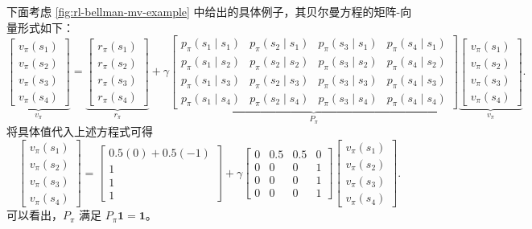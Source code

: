 下面考虑 \cref{fig:rl-bellman-mv-example} 中给出的具体例子，其贝尔曼方程的矩阵-向量形式如下：
\begin{equation*}
\underbrace{\begin{bmatrix} v_\pi(s_1) \\ v_\pi(s_2) \\ v_\pi(s_3) \\ v_\pi(s_4) \end{bmatrix}}_{v_\pi}
= \underbrace{\begin{bmatrix} r_\pi(s_1) \\ r_\pi(s_2) \\ r_\pi(s_3) \\ r_\pi(s_4) \end{bmatrix}}_{r_\pi}
+ \gamma \underbrace{\begin{bmatrix}
p_\pi(s_1 \mid s_1) & p_\pi(s_2 \mid s_1) & p_\pi(s_3 \mid s_1) & p_\pi(s_4 \mid s_1) \\
p_\pi(s_1 \mid s_2) & p_\pi(s_2 \mid s_2) & p_\pi(s_3 \mid s_2) & p_\pi(s_4 \mid s_2) \\
p_\pi(s_1 \mid s_3) & p_\pi(s_2 \mid s_3) & p_\pi(s_3 \mid s_3) & p_\pi(s_4 \mid s_3) \\
p_\pi(s_1 \mid s_4) & p_\pi(s_2 \mid s_4) & p_\pi(s_3 \mid s_4) & p_\pi(s_4 \mid s_4)
\end{bmatrix}}_{P_\pi}
\underbrace{\begin{bmatrix} v_\pi(s_1) \\ v_\pi(s_2) \\ v_\pi(s_3) \\ v_\pi(s_4) \end{bmatrix}}_{v_\pi}.
\end{equation*}
将具体值代入上述方程式可得
\begin{equation*}
\begin{bmatrix} v_\pi(s_1) \\ v_\pi(s_2) \\ v_\pi(s_3) \\ v_\pi(s_4) \end{bmatrix}
= \begin{bmatrix} 0.5(0) + 0.5(-1) \\ 1 \\ 1 \\ 1 \end{bmatrix}
+ \gamma \begin{bmatrix}
0 & 0.5 & 0.5 & 0 \\
0 & 0 & 0 & 1 \\
0 & 0 & 0 & 1 \\
0 & 0 & 0 & 1
\end{bmatrix}
\begin{bmatrix} v_\pi(s_1) \\ v_\pi(s_2) \\ v_\pi(s_3) \\ v_\pi(s_4) \end{bmatrix}.
\end{equation*}
可以看出，$P_\pi$ 满足 $P_\pi \mathbf{1} = \mathbf{1}$。

